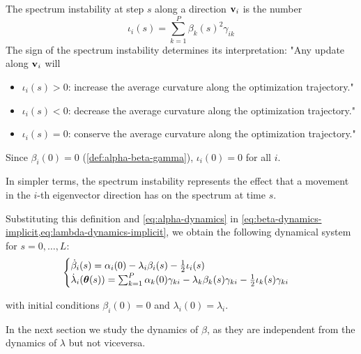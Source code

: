 \documentclass{article} %
\begin{document}
\begin{defn}
\label{def:spectrum-instability}
    The spectrum instability at step $s$ along a direction $\mbox{$\mbox{$\mathbf{v}$}$}_i$  is the number 
    \begin{equation}
        \iota_i(s)= \sum_{k=1}^P \beta_k(s)^2 \gamma_{ik}
    \end{equation} 
    The sign of the spectrum instability determines its interpretation: \newline
    "Any update along $\mbox{$\mbox{$\mathbf{v}$}$}_i$  will
    \begin{itemize}
    \item $\iota_i(s)> 0$:  increase the average curvature along the optimization trajectory."
    \item $\iota_i(s) < 0$:  decrease the average curvature along the optimization trajectory."
    \item $\iota_i(s) = 0$:  conserve the  average curvature along the optimization trajectory."
\end{itemize}
    Since $\beta_i(0)=0$ (\cref{def:alpha-beta-gamma}), $\iota_i(0)=0$ for all $i$. 
\end{defn}
In simpler terms, the spectrum instability represents the effect that a movement in the $i$-th eigenvector direction has on the spectrum at time $s$. 

\vspace{0.5cm}


Substituting this definition and \cref{eq:alpha-dynamics} in \cref{eq:beta-dynamics-implicit,eq:lambda-dynamics-implicit}, we obtain the following dynamical system for $s = 0, \dots, L$:
\begin{align}
\begin{cases}
\label{eq:beta-dynamics}
    \dot\beta_i(s) = \alpha_i(0) - \lambda_i \beta_i(s) - \frac{1}{2}\iota_i(s) \\
    \dot\lambda_i(\mbox{$\mbox{$\boldsymbol{\theta}$}$}(s)) = \sum_{k=1}^P \alpha_k(0)\gamma_{ki} - \lambda_k \beta_k(s)\gamma_{ki}  - \frac{1}{2}\iota_k(s)\gamma_{ki}
\end{cases}
\end{align}

with initial conditions $\beta_i(0) = 0$ and $\lambda_i(0) = \lambda_i$. 

In the next section we study the dynamics of $\beta$, as they are independent from the dynamics of $\lambda$ but not viceversa.

\newpage
\end{document}
